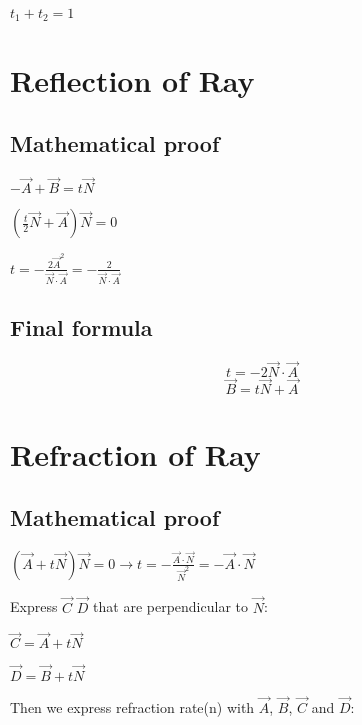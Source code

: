 \documentclass{article}
\begin{document}
$t_1 + t_2 = 1$

\section{Reflection of Ray}
\subsection{Mathematical proof}
$-\vec{A} + \vec{B} = t\vec{N}$

$(\frac{t}{2}\vec{N} + \vec{A})\vec{N} = 0$

$t = -\frac{2\vec{A}^2}{\vec{N} \cdot \vec{A}} = -\frac{2}{\vec{N} \cdot \vec{A}}$

\subsection{Final formula}
\begin{equation}
t = -2\vec{N} \cdot \vec{A}
\end{equation}
\begin{equation}
\vec{B} = t\vec{N} + \vec{A}
\end{equation}

\section{Refraction of Ray}
\subsection{Mathematical proof}

$
(\vec{A} + t\vec{N})\vec{N} = 0
\rightarrow
t = -\frac{\vec{A} \cdot \vec{N}}{\vec{N}^2}
=
-\vec{A} \cdot \vec{N}
$

Express $\vec{C}$ $\vec{D}$ that are perpendicular to $\vec{N}$:

$\vec{C} = \vec{A} + t\vec{N}$

$\vec{D} = \vec{B} + t\vec{N}$

Then we express refraction rate(n) with $\vec{A}$, $\vec{B}$, $\vec{C}$ and $\vec{D}$:
\end{document}
